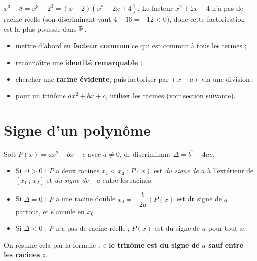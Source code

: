 \begin{exemple}
$x^3-8=x^3-2^3=(x-2)(x^2+2x+4)$. Le facteur $x^2+2x+4$ n'a pas de racine réelle (son
discriminant vaut $4-16=-12<0$), donc cette factorisation est la plus poussée dans $\mathbb{R}$.
\end{exemple}

\begin{aretenir}
\begin{itemize}
  \item mettre d'abord en \textbf{facteur commun} ce qui est commun à tous les termes ;
  \item reconnaître une \textbf{identité remarquable} ;
  \item chercher une \textbf{racine évidente}, puis factoriser par $(x-a)$ via une division ;
  \item pour un trinôme $ax^2+bx+c$, utiliser les racines (voir section suivante).
\end{itemize}
\end{aretenir}

\section{Signe d'un polynôme}

\begin{propriete}
Soit $P(x)=ax^2+bx+c$ avec $a\neq 0$, de discriminant $\Delta=b^2-4ac$.
\begin{itemize}
  \item Si $\Delta>0$ : $P$ a deux racines $x_1<x_2$ ; $P(x)$ est \emph{du signe de $a$}
        à l'extérieur de $[x_1\,;\,x_2]$ et \emph{du signe de $-a$} entre les racines.
  \item Si $\Delta=0$ : $P$ a une racine double $x_0=-\dfrac{b}{2a}$ ; $P(x)$ est du
        signe de $a$ partout, et s'annule en $x_0$.
  \item Si $\Delta<0$ : $P$ n'a pas de racine réelle ; $P(x)$ est du signe de $a$ pour
        tout $x$.
\end{itemize}
On résume cela par la formule : « \textbf{le trinôme est du signe de $a$ sauf entre les
racines} ».
\end{propriete}

\begin{illus}
\end{illus}

